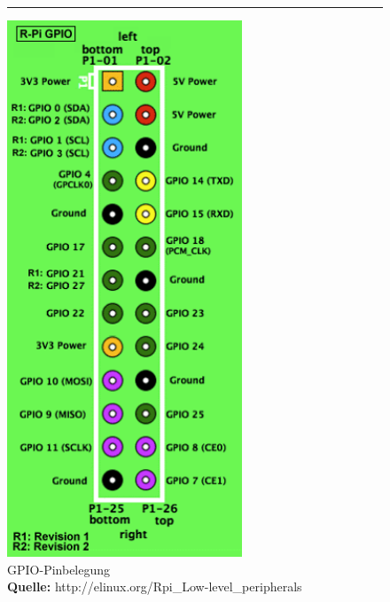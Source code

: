 \begin{figure}[H]
\centering
\rule{1cm}{1cm}
\includegraphics[keepaspectratio=true, width=7cm]{images/rpi/gpio.png}
\caption[GPIO-Pinbelegung]{GPIO-Pinbelegung\\ \textbf{Quelle:}
\label{fig:report_hardware_gpio2} http://elinux.org/Rpi\_Low-level\_peripherals}
\end{figure}